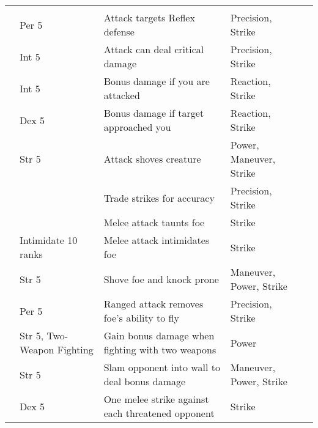 \begin{longtabuwrapper}
\begin{longtabu}{>{\lcol}p{10em} >{\lcol}p{15em} >{\lcol}X >{\lcol}p{8em} >{\lcol}p{3em}}
        \midrule
         &  &  &  &  \\
         & Per 5 & Attack targets Reflex defense & Precision, Strike &  \\
         & Int 5 & Attack can deal critical damage & Precision, Strike &  \\
         & Int 5 & Bonus damage if you are attacked & Reaction, Strike &  \\
         & Dex 5 & Bonus damage if target approached you & Reaction, Strike &  \\
         & Str 5 & Attack shoves creature  & Power, Maneuver, Strike &  \\
         & \x & Trade strikes for accuracy & Precision, Strike &  \\
         & \x & Melee attack taunts foe & Strike &  \\
         & Intimidate 10 ranks & Melee attack intimidates foe & Strike &  \\
         & Str 5 & Shove foe and knock prone & Maneuver, Power, Strike &  \\
         & Per 5 & Ranged attack removes foe's ability to fly & Precision, Strike &  \\
         & Str 5, Two-Weapon Fighting & Gain bonus damage when fighting with two weapons & Power &  \\
         & Str 5 & Slam opponent into wall to deal bonus damage & Maneuver, Power, Strike &  \\
         & Dex 5 & One melee strike against each threatened opponent & Strike &  \\


\end{longtabu}
\end{longtabuwrapper}
